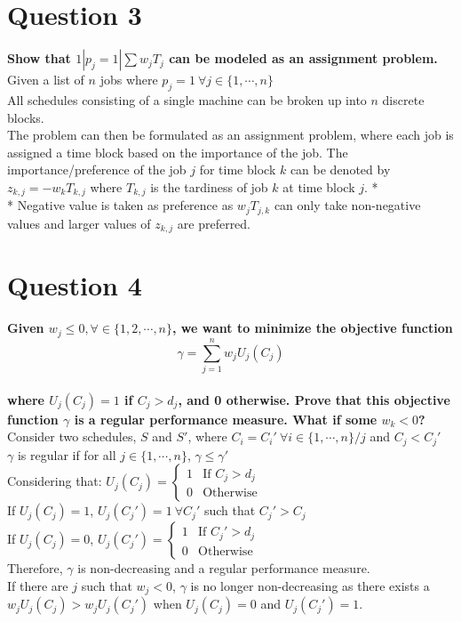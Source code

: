 \documentclass[a4paper, fleqn]{article}
\begin{document}
\section{Question 3}
\textbf{Show that $1|p_j=1|\sum w_jT_j$ can be modeled as an assignment problem.}\\
Given a list of $n$ jobs where $p_j=1\ \forall j\in\{1,\cdots,n\}$\\
All schedules consisting of a single machine can be broken up into $n$ discrete blocks.\\
The problem can then be formulated as an assignment problem, where each job is assigned a time block based on the importance of the job. The importance/preference of the job $j$ for time block $k$ can be denoted by $z_{k,j}=-w_kT_{k,j}$ where $T_{k,j}$ is the tardiness of job $k$ at time block $j$. *\\
*    Negative value is taken as preference as $w_jT_{j,k}$ can only take non-negative values and larger values of $z_{k,j}$ are preferred.

\section{Question 4}
\textbf{Given $w_j\leq0,\forall\in\{1,2,\cdots,n\}$, we want to minimize the objective function}
$$\gamma=\sum_{j=1}^n w_jU_j(C_j)$$\\
\textbf{where $U_j(C_j)=1$ if $C_j>d_j$, and 0 otherwise. Prove that this objective function $\gamma$ is a regular performance measure. What if some $w_k<0$?}\\
Consider two schedules, $S$ and $S'$, where $C_i=C_i'\ \forall i\in\{1,\cdots,n\}/j$ and $C_j< C_j'$\\
$\gamma$ is regular if for all $j\in\{1,\cdots,n\}$, $\gamma\leq\gamma'$\\
Considering that:
$U_j(C_j)=\left\{\begin{array}{ll}1&\text{If }C_j>d_j\\0&\text{Otherwise}\end{array}\right.$\\
If $U_j(C_j)=1$, $U_j(C_j')=1\ \forall C_j'$ such that $C_j'>C_j$\\
If $U_j(C_j)=0$, 
$U_j(C_j')=\left\{\begin{array}{ll}1&\text{If }C_j'>d_j\\0&\text{Otherwise}\end{array}\right.$\\
Therefore, $\gamma$ is non-decreasing and a regular performance measure.\\
If there are $j$ such that $w_j<0$, $\gamma$ is no longer non-decreasing as there exists a $w_jU_j(C_j)>w_jU_j(C_j')$ when $U_j(C_j)=0$ and $U_j(C_j')=1$. 
\end{document}

